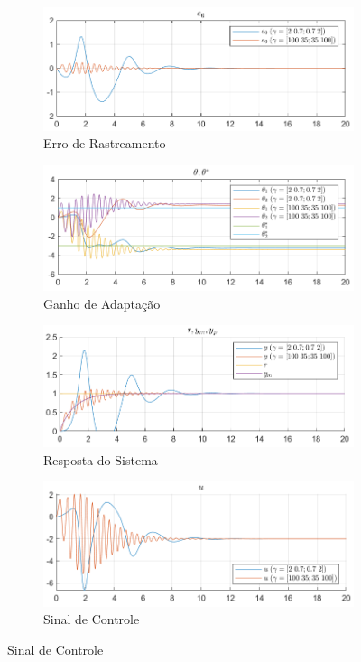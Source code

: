 \documentclass[10pt]{article}
\begin{document}
\begin{figure}[h!]
    \centering
    \begin{subfigure}[b]{0.3\textwidth}
        \centering
        \includegraphics[width=\textwidth]{img/fig09a.png}
        \caption{Erro de Rastreamento}
    \end{subfigure}
    \begin{subfigure}[b]{0.3\textwidth}
        \centering
        \includegraphics[width=\textwidth]{img/fig09b.png}
        \caption{Ganho de Adaptação}
    \end{subfigure}

    \begin{subfigure}[b]{0.3\textwidth}
        \centering
        \includegraphics[width=\textwidth]{img/fig09c.png}
        \caption{Resposta do Sistema}
    \end{subfigure}
    \begin{subfigure}[b]{0.3\textwidth}
        \centering
        \includegraphics[width=\textwidth]{img/fig09e.png}
        \caption{Sinal de Controle}
    \end{subfigure}


\end{figure}
\end{document}
